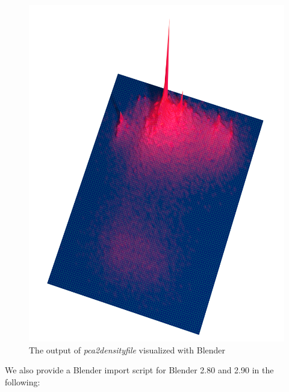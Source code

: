 \begin{figure}
  \begin{center}
    \includegraphics{pca-density-file.png}
    \caption{The output of \emph{pca2densityfile} visualized with
      Blender \cite{blender}}
    \label{fig-pca2densityfile}
  \end{center}
\end{figure}
We also provide a Blender import script for Blender 2.80 and 2.90
in the following:
